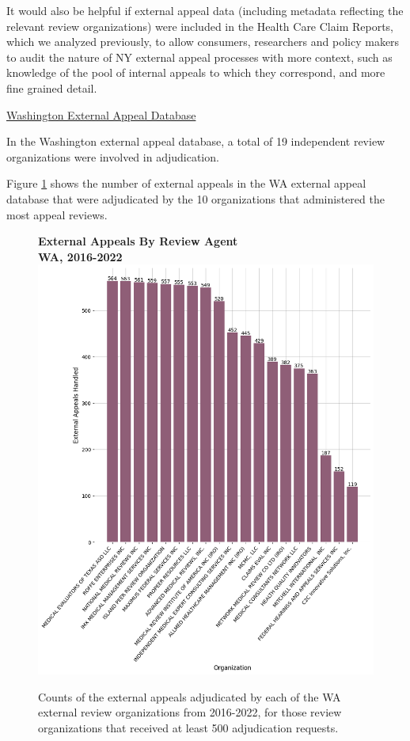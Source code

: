 \documentclass[12pt, a4paper,twoside,parskip=full]{report}
\theoremstyle{plain} %
\theoremstyle{definition} %
\theoremstyle{remark} %
\numberwithin{equation}{chapter}
\begin{document}
		It would also be helpful if external appeal data (including metadata reflecting the relevant review organizations) were included in the Health Care Claim Reports, which we analyzed previously, to allow consumers, researchers and policy makers to audit the nature of NY external appeal processes with more context, such as knowledge of the pool of internal appeals to which they correspond, and more fine grained detail.
		
		\underline{Washington External Appeal Database}
		
		In the Washington external appeal database, a total of 19 independent review organizations were involved in adjudication.
		
		Figure \ref{waexternalappealsbyreviewagent} shows the number of external appeals in the WA external appeal database that were adjudicated by the 10 organizations that administered the most appeal reviews.
		
		
		\begin{figure}[h!]
			\centering
			\textbf{External Appeals By Review Agent}\\
			\textbf{WA, 2016-2022}\\
			\includegraphics[width=.8\textwidth]{images/wa_external_appeals/external_appeals_by_agent.png}
			\caption{Counts of the external appeals adjudicated by each of the WA external review organizations from 2016-2022, for those review organizations that received at least 500 adjudication requests.}
			\label{waexternalappealsbyreviewagent}
		\end{figure}
		\clearpage
	
\end{document}

